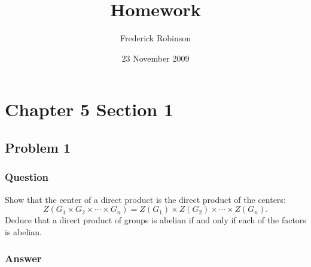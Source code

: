 \documentclass[12pt]{article}
\title{Homework}
\author{Frederick Robinson}
\date{23 November 2009}
\begin{document}

   \maketitle

\setcounter{tocdepth}{2} 

\tableofcontents

\section{Chapter 5 Section 1}
\subsection{Problem 1}

\subsubsection{Question}

Show that the center of a direct product is the direct product of the centers:
\[Z(G_1 \times G_2 \times \cdots \times G_n) = Z(G_1) \times Z(G_2) \times \cdots \times Z(G_n).\]
Deduce that a direct product of groups is abelian if and only if each of the factors is abelian.

\subsubsection{Answer}
\end{document}
